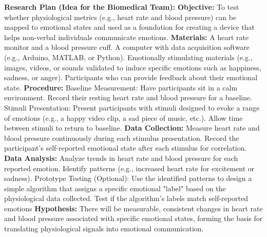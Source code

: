\documentclass[12pt, research paper]{report}
\begin{document}
	\noindent \textbf{Research Plan (Idea for the Biomedical Team):}
	\newline \textbf{Objective:}
	To test whether physiological metrics (e.g., heart rate and blood pressure) can be mapped to emotional states and used as a foundation for creating a device that helps non-verbal individuals communicate emotions.
	\newline \textbf{Materials:}
	A heart rate monitor and a blood pressure cuff.
	A computer with data acquisition software (e.g., Arduino, MATLAB, or Python).
	Emotionally stimulating materials (e.g., images, videos, or sounds validated to induce specific emotions such as happiness, sadness, or anger).
	Participants who can provide feedback about their emotional state.
	\newline \textbf{Procedure:}
	Baseline Measurement:
	Have participants sit in a calm environment.
	Record their resting heart rate and blood pressure for a baseline.
	Stimuli Presentation:
	Present participants with stimuli designed to evoke a range of emotions (e.g., a happy video clip, a sad piece of music, etc.).
	Allow time between stimuli to return to baseline.
	\newline \textbf{Data Collection:}
	Measure heart rate and blood pressure continuously during each stimulus presentation.
	Record the participant’s self-reported emotional state after each stimulus for correlation.
	\newline \textbf{Data Analysis:}
	Analyze trends in heart rate and blood pressure for each reported emotion.
	Identify patterns (e.g., increased heart rate for excitement or sadness).
	Prototype Testing (Optional):
	Use the identified patterns to design a simple algorithm that assigns a specific emotional "label" based on the physiological data collected.
	Test if the algorithm's labels match self-reported emotions
	\newline \textbf{Hypothesis:}
	There will be measurable, consistent changes in heart rate and blood pressure associated with specific emotional states, forming the basis for translating physiological signals into emotional communication.
	
	
	
\end{document}
